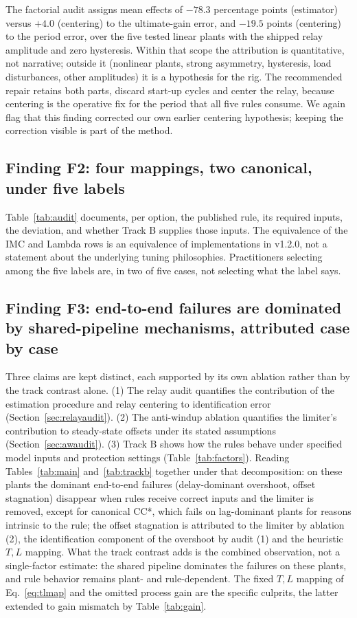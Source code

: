 \documentclass[10pt,twocolumn]{article}
\begin{document}
The factorial audit assigns mean effects of $-78.3$ percentage points (estimator) versus $+4.0$ (centering) to the ultimate-gain error, and $-19.5$ points (centering) to the period error, over the five tested linear plants with the shipped relay amplitude and zero hysteresis. Within that scope the attribution is quantitative, not narrative; outside it (nonlinear plants, strong asymmetry, hysteresis, load disturbances, other amplitudes) it is a hypothesis for the rig. The recommended repair retains both parts, discard start-up cycles and center the relay, because centering is the operative fix for the period that all five rules consume. We again flag that this finding corrected our own earlier centering hypothesis; keeping the correction visible is part of the method.

\subsection{Finding F2: four mappings, two canonical, under five labels}

Table~\ref{tab:audit} documents, per option, the published rule, its required inputs, the deviation, and whether Track B supplies those inputs. The equivalence of the IMC and Lambda rows is an equivalence of implementations in v1.2.0, not a statement about the underlying tuning philosophies. Practitioners selecting among the five labels are, in two of five cases, not selecting what the label says.

\subsection{Finding F3: end-to-end failures are dominated by shared-pipeline mechanisms, attributed case by case}

Three claims are kept distinct, each supported by its own ablation rather than by the track contrast alone. (1) The relay audit quantifies the contribution of the estimation procedure and relay centering to identification error (Section~\ref{sec:relayaudit}). (2) The anti-windup ablation quantifies the limiter's contribution to steady-state offsets under its stated assumptions (Section~\ref{sec:awaudit}). (3) Track B shows how the rules behave under specified model inputs and protection settings (Table~\ref{tab:factors}). Reading Tables~\ref{tab:main} and~\ref{tab:trackb} together under that decomposition: on these plants the dominant end-to-end failures (delay-dominant overshoot, offset stagnation) disappear when rules receive correct inputs and the limiter is removed, except for canonical CC*, which fails on lag-dominant plants for reasons intrinsic to the rule; the offset stagnation is attributed to the limiter by ablation (2), the identification component of the overshoot by audit (1) and the heuristic $T,L$ mapping. What the track contrast adds is the combined observation, not a single-factor estimate: the shared pipeline dominates the failures on these plants, and rule behavior remains plant- and rule-dependent. The fixed $T,L$ mapping of Eq.~\eqref{eq:tlmap} and the omitted process gain are the specific culprits, the latter extended to gain mismatch by Table~\ref{tab:gain}.
\end{document}
